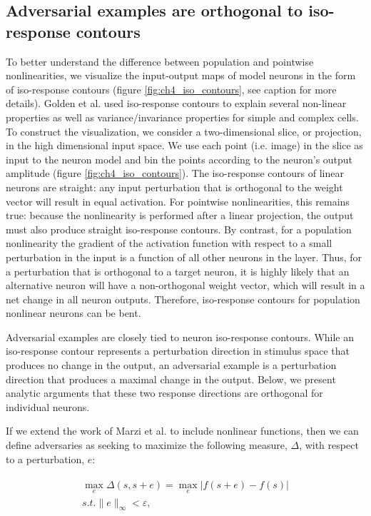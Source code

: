 \subsection{Adversarial examples are orthogonal to iso-response contours}
To better understand the difference between population and pointwise nonlinearities, we visualize the input-output maps of model neurons in the form of iso-response contours (figure \ref{fig:ch4_iso_contours}, see caption for more details). Golden et al. \citeyearpar{golden2016conjectures} used iso-response contours to explain several non-linear properties as well as variance/invariance properties for simple and complex cells. To construct the visualization, we consider a two-dimensional slice, or projection, in the high dimensional input space. We use each point (i.e. image) in the slice as input to the neuron model and bin the points according to the neuron's output amplitude (figure \ref{fig:ch4_iso_contours}). The iso-response contours of linear neurons are straight: any input perturbation that is orthogonal to the weight vector will result in equal activation. For pointwise nonlinearities, this remains true: because the nonlinearity is performed after a linear projection, the output must also produce straight iso-response contours. By contrast, for a population nonlinearity the gradient of the activation function with respect to a small perturbation in the input is a function of all other neurons in the layer. Thus, for a perturbation that is orthogonal to a target neuron, it is highly likely that an alternative neuron will have a non-orthogonal weight vector, which will result in a net change in all neuron outputs. Therefore, iso-response contours for population nonlinear neurons can be bent.

Adversarial examples are closely tied to neuron iso-response contours. While an iso-response contour represents a perturbation direction in stimulus space that produces no change in the output, an adversarial example is a perturbation direction that produces a maximal change in the output. Below, we present analytic arguments that these two response directions are orthogonal for individual neurons.

If we extend the work of Marzi et al. \citeyearpar{marzi2018sparsity} to include nonlinear functions, then we can define adversaries as seeking to maximize the following measure, $\Delta$, with respect to a perturbation, $e$:

\begin{align}\label{eq:ch4_adv_metric}
\begin{split}
    \max_{e} \Delta (s, s+e) = \max_{e} |f(s+e) - f(s)| \\
    s.t. \|e\|_{\infty} < \varepsilon,
\end{split}
\end{align}

